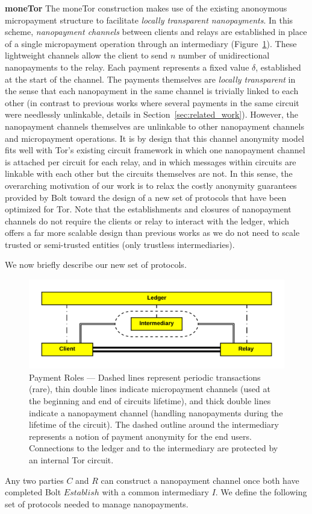 \textbf{moneTor} The moneTor construction makes use of the existing anonoymous
micropayment structure to facilitate \emph{locally transparent nanopayments}. In
this scheme, \emph{nanopayment channels} between clients and relays are established in place of a single
micropayment operation through an intermediary (Figure~\ref{fig:parties}). These lightweight channels allow the client to send $n$
number of unidirectional nanopayments to the relay. Each payment represents a
fixed value $\delta$, established at the start of the channel. The payments
themselves are \emph{locally transparent} in the sense that each nanopayment in
the same channel is trivially linked to each other (in contrast to previous works where several payments in the same circuit were needlessly unlinkable, details in Section~\ref{sec:related_work}). However, the nanopayment
channels themselves are unlinkable to other nanopayment channels and
micropayment operations. It is by design that this channel anonymity model fits
well with Tor's existing circuit framework in which one nanopayment channel is attached per circuit for each relay, and in which messages within circuits are
linkable with each other but the circuits themselves are not. In this sense, the
overarching motivation of our work is to relax the costly anonymity guarantees
provided by Bolt toward the design of a new set of protocols that have been
optimized for Tor. Note that the establishments and closures of nanopayment channels do not require the clients or relay to interact with the ledger, which offers a far more scalable design than previous works as we do not need to scale trusted or semi-trusted entities (only trustless intermediaries).

 We now briefly describe our new set of protocols.
\begin{figure}[h] \centering
  \includegraphics[trim={0.5cm, 0.5cm, 0.5cm, 0.5cm}, clip, scale=0.6]{images/party_diagram.png}
  \caption[Payment Roles]{Payment Roles --- Dashed lines represent periodic
    transactions (rare), thin double lines indicate micropayment channels (used at the beginning and end of circuits lifetime), and thick
    double lines indicate a nanopayment channel (handling nanopayments during the lifetime of the circuit). The dashed outline around the
    intermediary represents a notion of payment anonymity for the end users. Connections to the ledger and to the intermediary are protected by an internal Tor circuit.}
  \label{fig:parties}
\end{figure}
Any two parties $C$ and $R$ can construct a nanopayment channel once both have
completed Bolt $Establish$ with a common intermediary $I$. We define the following
set of protocols needed to manage nanopayments.

